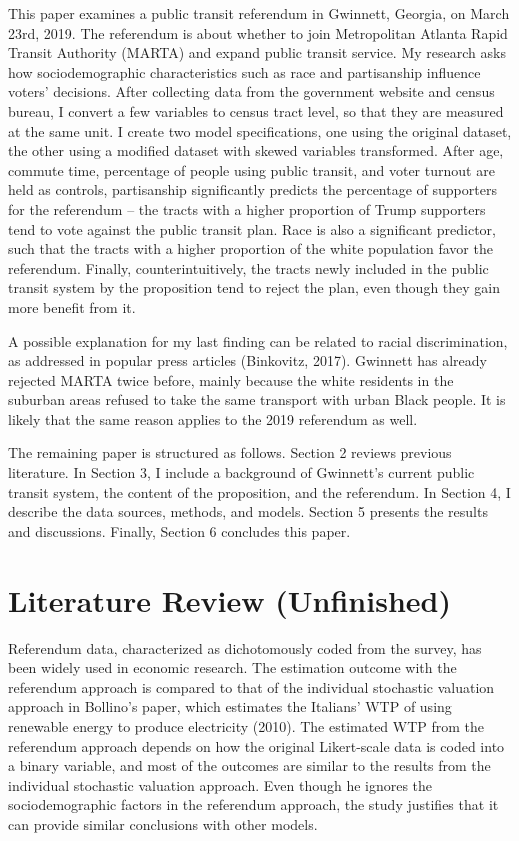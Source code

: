 \documentclass[
]{article}
\begin{document}
This paper examines a public transit referendum in Gwinnett, Georgia, on
March 23rd, 2019. The referendum is about whether to join Metropolitan
Atlanta Rapid Transit Authority (MARTA) and expand public transit
service. My research asks how sociodemographic characteristics such as
race and partisanship influence voters' decisions. After collecting data
from the government website and census bureau, I convert a few variables
to census tract level, so that they are measured at the same unit. I
create two model specifications, one using the original dataset, the
other using a modified dataset with skewed variables transformed. After
age, commute time, percentage of people using public transit, and voter
turnout are held as controls, partisanship significantly predicts the
percentage of supporters for the referendum -- the tracts with a higher
proportion of Trump supporters tend to vote against the public transit
plan. Race is also a significant predictor, such that the tracts with a
higher proportion of the white population favor the referendum. Finally,
counterintuitively, the tracts newly included in the public transit
system by the proposition tend to reject the plan, even though they gain
more benefit from it.

A possible explanation for my last finding can be related to racial
discrimination, as addressed in popular press articles (Binkovitz,
2017). Gwinnett has already rejected MARTA twice before, mainly because
the white residents in the suburban areas refused to take the same
transport with urban Black people. It is likely that the same reason
applies to the 2019 referendum as well.

The remaining paper is structured as follows. Section 2 reviews previous
literature. In Section 3, I include a background of Gwinnett's current
public transit system, the content of the proposition, and the
referendum. In Section 4, I describe the data sources, methods, and
models. Section 5 presents the results and discussions. Finally, Section
6 concludes this paper.

\hypertarget{literature-review-unfinished}{%
\section{Literature Review
(Unfinished)}\label{literature-review-unfinished}}

Referendum data, characterized as dichotomously coded from the survey,
has been widely used in economic research. The estimation outcome with
the referendum approach is compared to that of the individual stochastic
valuation approach in Bollino's paper, which estimates the Italians' WTP
of using renewable energy to produce electricity (2010). The estimated
WTP from the referendum approach depends on how the original
Likert-scale data is coded into a binary variable, and most of the
outcomes are similar to the results from the individual stochastic
valuation approach. Even though he ignores the sociodemographic factors
in the referendum approach, the study justifies that it can provide
similar conclusions with other models.
\end{document}
